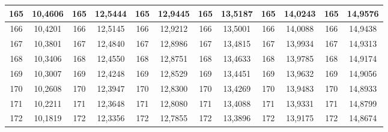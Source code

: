 \documentclass[a4paper,12pt]{article} %
\begin{document}
\begin{longtable}[c]{cccccccccc|c|c|}
	\multicolumn{1}{|c|}{165} & \multicolumn{1}{c|}{10,4606} & \multicolumn{1}{c|}{165} & \multicolumn{1}{c|}{12,5444} & \multicolumn{1}{c|}{165} & \multicolumn{1}{c|}{12,9445} & \multicolumn{1}{c|}{165} & \multicolumn{1}{c|}{13,5187} & \multicolumn{1}{c|}{165} & 14,0243 & 165 & 14,9576 \\ \hline
	\multicolumn{1}{|c|}{166} & \multicolumn{1}{c|}{10,4201} & \multicolumn{1}{c|}{166} & \multicolumn{1}{c|}{12,5145} & \multicolumn{1}{c|}{166} & \multicolumn{1}{c|}{12,9212} & \multicolumn{1}{c|}{166} & \multicolumn{1}{c|}{13,5001} & \multicolumn{1}{c|}{166} & 14,0088 & 166 & 14,9438 \\ \hline
	\multicolumn{1}{|c|}{167} & \multicolumn{1}{c|}{10,3801} & \multicolumn{1}{c|}{167} & \multicolumn{1}{c|}{12,4840} & \multicolumn{1}{c|}{167} & \multicolumn{1}{c|}{12,8986} & \multicolumn{1}{c|}{167} & \multicolumn{1}{c|}{13,4815} & \multicolumn{1}{c|}{167} & 13,9934 & 167 & 14,9313 \\ \hline
	\multicolumn{1}{|c|}{168} & \multicolumn{1}{c|}{10,3406} & \multicolumn{1}{c|}{168} & \multicolumn{1}{c|}{12,4550} & \multicolumn{1}{c|}{168} & \multicolumn{1}{c|}{12,8751} & \multicolumn{1}{c|}{168} & \multicolumn{1}{c|}{13,4633} & \multicolumn{1}{c|}{168} & 13,9785 & 168 & 14,9174 \\ \hline
	\multicolumn{1}{|c|}{169} & \multicolumn{1}{c|}{10,3007} & \multicolumn{1}{c|}{169} & \multicolumn{1}{c|}{12,4248} & \multicolumn{1}{c|}{169} & \multicolumn{1}{c|}{12,8529} & \multicolumn{1}{c|}{169} & \multicolumn{1}{c|}{13,4451} & \multicolumn{1}{c|}{169} & 13,9632 & 169 & 14,9056 \\ \hline
	\multicolumn{1}{|c|}{170} & \multicolumn{1}{c|}{10,2608} & \multicolumn{1}{c|}{170} & \multicolumn{1}{c|}{12,3947} & \multicolumn{1}{c|}{170} & \multicolumn{1}{c|}{12,8300} & \multicolumn{1}{c|}{170} & \multicolumn{1}{c|}{13,4269} & \multicolumn{1}{c|}{170} & 13,9483 & 170 & 14,8933 \\ \hline
	\multicolumn{1}{|c|}{171} & \multicolumn{1}{c|}{10,2211} & \multicolumn{1}{c|}{171} & \multicolumn{1}{c|}{12,3648} & \multicolumn{1}{c|}{171} & \multicolumn{1}{c|}{12,8080} & \multicolumn{1}{c|}{171} & \multicolumn{1}{c|}{13,4088} & \multicolumn{1}{c|}{171} & 13,9331 & 171 & 14,8799 \\ \hline
	\multicolumn{1}{|c|}{172} & \multicolumn{1}{c|}{10,1819} & \multicolumn{1}{c|}{172} & \multicolumn{1}{c|}{12,3356} & \multicolumn{1}{c|}{172} & \multicolumn{1}{c|}{12,7855} & \multicolumn{1}{c|}{172} & \multicolumn{1}{c|}{13,3896} & \multicolumn{1}{c|}{172} & 13,9175 & 172 & 14,8674 \\ \hline

\end{longtable}
\end{document}
